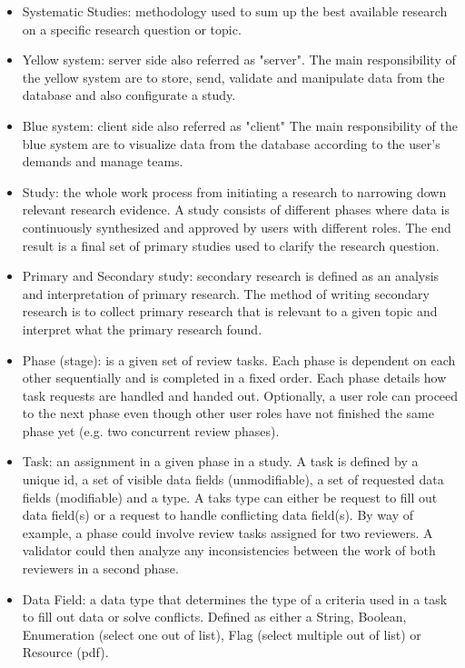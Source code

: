 	\begin{itemize}
	  \item Systematic Studies: methodology used to sum up the best available research on a specific research question or topic.  
	  \item Yellow system: server side also referred as "server". The main responsibility of the yellow system are to store, send, validate and manipulate data from the database and also configurate a study.
	  \item Blue system: client side also referred as "client" The main responsibility of the blue system are to visualize data from the database according to the user's demands and manage teams.
	  \item Study: the whole work process from initiating a research to narrowing down relevant research evidence. A study consists of different phases where data is continuously synthesized and approved by users with different roles. The end result is a final set of primary studies used to clarify the research question. 
	  \item Primary and Secondary study: secondary research is defined as an analysis and interpretation of primary research. The method of writing secondary research is to collect primary research that is relevant to a given topic and interpret what the primary research found.
	  \item Phase (stage): is a given set of review tasks. Each phase is dependent on each other sequentially and is completed in a fixed order. Each phase details how task requests are handled and handed out. Optionally, a user role can proceed to the next phase even though other user roles have not finished the same phase yet (e.g. two concurrent review phases).
	  \item Task: an assignment in a given phase in a study. A task is defined by a unique id, a set of visible data fields (unmodifiable), a set of requested data fields (modifiable) and a type. A taks type can either be  request to fill out data field(s) or a request to handle conflicting data field(s). By way of example, a phase could involve review tasks assigned for two reviewers. A validator could then analyze any inconsistencies between the work of both reviewers in a second phase.
	  \item Data Field: a data type that determines the type of a criteria used in a task to fill out data or solve conflicts. Defined as either a String, Boolean, Enumeration (select one out of list), Flag (select multiple out of list) or Resource (pdf). 

\end{itemize}
